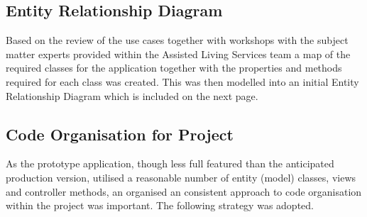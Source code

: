 \documentclass[a4paper,Times New Roman 11pt]{article}
\begin{document}
\subsection { Entity Relationship Diagram}
Based on the review of the use cases together with workshops with the subject matter experts provided within the Assisted Living Services team a map of the required classes for the application together with the properties and methods required for each class was created. This was then modelled into an initial Entity Relationship Diagram which is included on the next page.
 

\subsection { Code Organisation for Project}
As the prototype application, though less full featured than the anticipated production version, utilised a reasonable number of entity (model) classes, views and controller methods, an organised an consistent approach to code organisation within the project was important. The following strategy was adopted.
\end{document}
